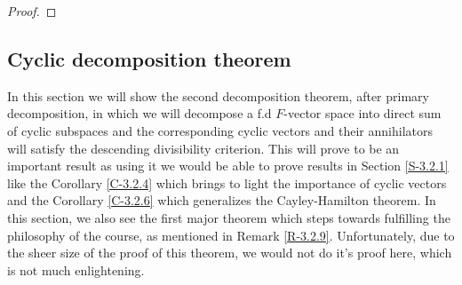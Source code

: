 \documentclass[letterpaper,11pt,twoside]{article}
\theoremstyle{definition}
\theoremstyle{definition}
\theoremstyle{definition}
\theoremstyle{definition}
\theoremstyle{definition}
\theoremstyle{definition}
\theoremstyle{remark}
\theoremstyle{definition}
\newcommand{\Ann}[1]{\text{Ann}\left(#1\right)}
\begin{document}
\begin{proof}
    \end{proof}

    \subsection{Cyclic decomposition theorem}
    In this section we will show the second decomposition theorem, after primary decomposition, in which we will decompose a f.d $ F $-vector space into direct sum of cyclic subspaces and the corresponding cyclic vectors and their annihilators will satisfy the descending divisibility criterion. This will prove to be an important result as using it we would be able to prove results in Section \ref{S-3.2.1} like the Corollary \ref{C-3.2.4} which brings to light the importance of cyclic vectors and the Corollary \ref{C-3.2.6} which generalizes the Cayley-Hamilton theorem. In this section, we also see the first major theorem which steps towards fulfilling the philosophy of the course, as mentioned in Remark \ref{R-3.2.9}. Unfortunately, due to the sheer size of the proof of this theorem, we would not do it's proof here, which is not much enlightening.\\
    
\end{document}
